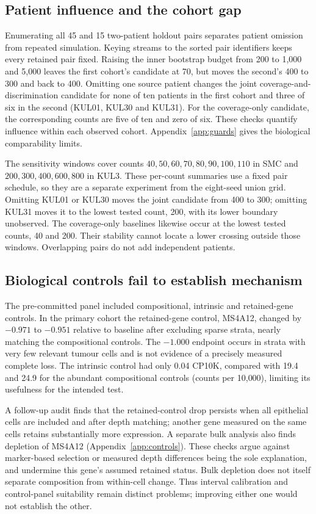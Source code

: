 \subsection{Patient influence and the cohort gap}
Enumerating all 45 and 15 two-patient holdout pairs separates patient omission
from repeated simulation. Keying streams to the sorted pair identifiers keeps
every retained pair fixed. Raising the inner bootstrap budget from 200 to 1{,}000
and 5{,}000 leaves the first cohort's candidate at 70, but moves the second's
400 to 300 and back to 400. Omitting one source patient changes the joint
coverage-and-discrimination candidate for none of ten patients in the first
cohort and three of six in the second (KUL01, KUL30 and KUL31). For the
coverage-only candidate, the corresponding counts are five of ten and zero of
six. These checks quantify influence within each observed cohort.
Appendix~\ref{app:guards} gives the biological comparability limits.


The sensitivity windows cover counts $40,50,60,70,80,90,100,110$ in SMC and
$200,300,400,600,800$ in KUL3. These per-count summaries use a fixed pair
schedule, so they are a separate experiment from the eight-seed union grid.
Omitting KUL01 or KUL30 moves the joint candidate from 400 to 300; omitting
KUL31 moves it to the lowest tested count, 200, with its lower boundary
unobserved. The coverage-only baselines likewise occur at the lowest tested
counts, 40 and 200. Their stability cannot locate a lower crossing outside
those windows. Overlapping pairs do not add independent patients.



\subsection{Biological controls fail to establish mechanism}\label{sec:biocontrols}
The pre-committed panel included compositional, intrinsic and retained-gene
controls. In the primary cohort the retained-gene control, MS4A12, changed by
$-0.971$ to $-0.951$ relative to baseline after excluding sparse strata,
nearly matching the compositional controls. The $-1.000$ endpoint occurs in
strata with very few relevant tumour cells and is not evidence of a precisely
measured complete loss. The intrinsic control had only 0.04 CP10K, compared
with 19.4 and 24.9 for the abundant compositional controls (counts per
10{,}000), limiting its usefulness for the intended test.

A follow-up audit finds that the retained-control drop persists when all
epithelial cells are included and after depth matching; another gene measured
on the same cells retains substantially more expression. A separate bulk
analysis also finds depletion of MS4A12 (Appendix~\ref{app:controls}). These
checks argue against marker-based selection or measured depth differences
being the sole explanation, and undermine this gene's assumed retained status.
Bulk depletion does not itself separate composition from within-cell change.
Thus interval calibration and control-panel suitability remain distinct
problems; improving either one would not establish the other.
